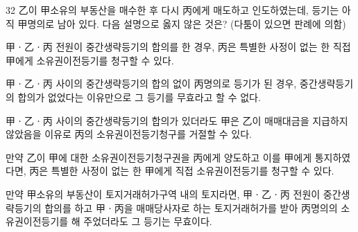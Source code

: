 \begin{question}{32}
乙이 甲소유의 부동산을 매수한 후 다시 丙에게 매도하고 인도하였는데, 등기는 아직 甲명의로 남아 있다. 다음 설명으로 옳지 않은 것은? (다툼이 있으면 판례에 의함)
\begin{choices}
  \item 甲ㆍ乙ㆍ丙 전원이 중간생략등기의 합의를 한 경우, 丙은 특별한 사정이 없는 한 직접 甲에게 소유권이전등기를 청구할 수 있다.
  \item 甲ㆍ乙ㆍ丙 사이의 중간생략등기의 합의 없이 丙명의로 등기가 된 경우, 중간생략등기의 합의가 없었다는 이유만으로 그 등기를 무효라고 할 수 없다.
  \item 甲ㆍ乙ㆍ丙 사이의 중간생략등기의 합의가 있더라도 甲은 乙이 매매대금을 지급하지 않았음을 이유로 丙의 소유권이전등기청구를 거절할 수 있다.
  \item 만약 乙이 甲에 대한 소유권이전등기청구권을 丙에게 양도하고 이를 甲에게 통지하였다면, 丙은 특별한 사정이 없는 한 甲에게 직접 소유권이전등기를 청구할 수 있다.
  \item 만약 甲소유의 부동산이 토지거래허가구역 내의 토지라면, 甲ㆍ乙ㆍ丙 전원이 중간생략등기의 합의를 하고 甲ㆍ丙을 매매당사자로 하는 토지거래허가를 받아 丙명의의 소유권이전등기를 해 주었더라도 그 등기는 무효이다.
\end{choices}
\end{question}
